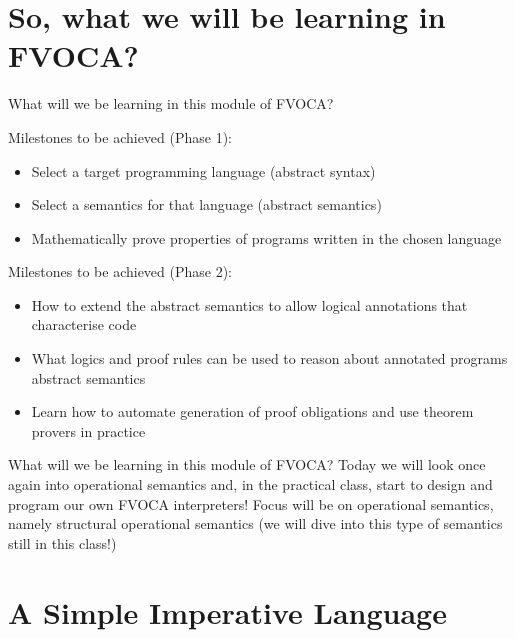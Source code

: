 \documentclass[aspectratio=169]{beamer}
\begin{document}
\section*{So, what we will be learning in FVOCA?}

\begin{slide}{What will we be learning in this module of FVOCA?}
\begin{block}{Milestones to be achieved (Phase 1):}
\begin{itemize}
  \item Select a target programming language (abstract syntax)
  \item Select a semantics for that language (abstract semantics)
  \item Mathematically prove properties of programs written in the chosen language
\end{itemize}
\end{block}

\begin{block}{Milestones to be achieved (Phase 2):}
\begin{itemize}
  \item How to extend the abstract semantics to allow logical annotations that characterise code
  \item What logics and proof rules can be used to reason about annotated programs abstract semantics
  \item Learn how to automate generation of proof obligations and use theorem provers in practice 
\end{itemize}
\end{block}
\end{slide}

\begin{slide}{What will we be learning in this module of FVOCA?}
Today we will look once again into operational semantics and, in the practical class, start to design and program our own FVOCA interpreters! Focus will be on operational semantics, namely structural operational semantics (we will dive into this type of semantics still in this class!)  
\end{slide}


\section*{A Simple Imperative Language}
\end{document}
